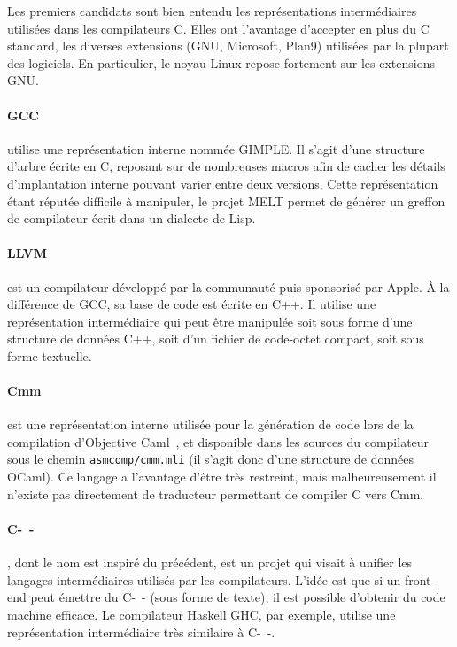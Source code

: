 Les premiers candidats sont bien entendu les représentations intermédiaires
utilisées dans les compilateurs C. Elles ont l'avantage d'accepter en plus du C
standard, les diverses extensions (GNU, Microsoft, Plan9) utilisées par la
plupart des logiciels. En particulier, le noyau Linux repose fortement sur les
extensions GNU.\@

\paragraph{GCC} utilise une représentation interne nommée
GIMPLE\cite{gcc-gimple}. Il s'agit d'une structure d'arbre écrite en C, reposant
sur de nombreuses macros afin de cacher les détails d'implantation interne
pouvant varier entre deux versions. Cette représentation étant réputée difficile
à manipuler, le projet MELT\cite{gcc-melt} permet de générer un greffon de
compilateur écrit dans un dialecte de Lisp.

\paragraph{LLVM}\cite{llvm-pres} est un compilateur développé par la communauté
puis sponsorisé par Apple. À la différence de GCC, sa base de code est écrite en
C++. Il utilise une représentation intermédiaire qui peut être manipulée soit
sous forme d'une structure de données C++, soit d'un fichier de code-octet
compact, soit sous forme textuelle.

\paragraph{Cmm} est une représentation interne utilisée pour la génération de
code lors de la compilation d'Objective Caml~, et disponible
dans les sources du compilateur sous le chemin \texttt{asmcomp/cmm.mli} (il
s'agit donc d'une structure de données OCaml). Ce langage a l'avantage d'être
très restreint, mais malheureusement il n'existe pas directement de traducteur
permettant de compiler C vers Cmm.

\paragraph{C-~-}\cite{spjcmm} , dont le nom est inspiré du précédent,
est un projet qui visait à unifier les langages intermédiaires utilisés par les
compilateurs. L'idée est que si un front-end peut émettre du C-~- (sous forme de
texte), il est possible d'obtenir du code machine efficace. Le compilateur
Haskell GHC, par exemple, utilise une représentation intermédiaire très
similaire à C-~-.

